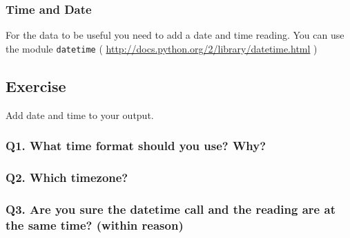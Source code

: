 \documentclass[aspectratio=1610,9pt]{beamer} %
\begin{document}
\begin{frame}
\frametitle{Time and Date}

For the data to be useful you need to add a date and time reading. You
can use the module \texttt{datetime} (
\href{http://docs.python.org/2/library/datetime.html}{http://docs.python.org/2/library/datetime.html}
)

\subsection{Exercise}

Add date and time to your output.

\subsubsection{Q1. What time format should you use?
Why?}

\subsubsection{Q2. Which timezone?}

\subsubsection{Q3. Are you sure the datetime call and the reading are at
the same time? (within
reason)}

\end{frame}
\end{document}
